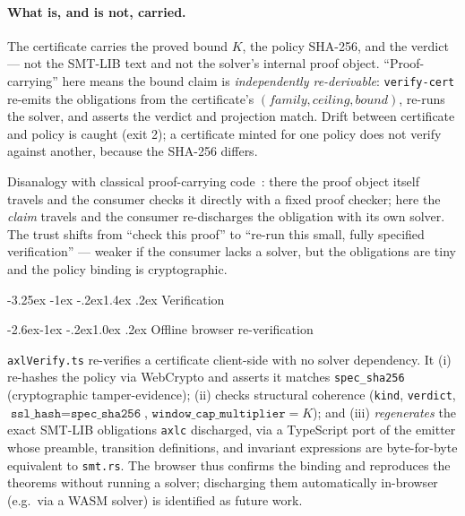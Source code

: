 \documentclass[11pt]{article}
\makeatletter
\renewcommand\section{\@startsection{section}{1}{\z@}%
  {-3.25ex \@plus -1ex \@minus -.2ex}{1.4ex \@plus.2ex}%
  {\normalfont\sffamily\Large\bfseries}}
\renewcommand\subsection{\@startsection{subsection}{2}{\z@}%
  {-2.6ex\@plus -1ex \@minus -.2ex}{1.0ex \@plus .2ex}%
  {\normalfont\sffamily\large\bfseries}}
\theoremstyle{plain}
\theoremstyle{definition}
\theoremstyle{remark}
\makeatother
\begin{document}
\paragraph{What is, and is not, carried.}
The certificate carries the proved bound $K$, the policy SHA-256, and the
verdict --- not the SMT-LIB text and not the solver's internal proof object.
``Proof-carrying'' here means the bound claim is \emph{independently
re-derivable}: \texttt{verify-cert} re-emits the obligations from the
certificate's $(\textit{family},\textit{ceiling},\textit{bound})$, re-runs the
solver, and asserts the verdict and projection match. Drift between
certificate and policy is caught (exit 2); a certificate minted for one policy
does not verify against another, because the SHA-256 differs.

Disanalogy with classical proof-carrying code~\citep{necula1997}: there the
proof object itself travels and the consumer checks it directly with a fixed
proof checker; here the \emph{claim} travels and the consumer re-discharges the
obligation with its own solver. The trust shifts from ``check this proof'' to
``re-run this small, fully specified verification'' --- weaker if the consumer
lacks a solver, but the obligations are tiny and the policy binding is
cryptographic.

\section{Verification}\label{sec:verification}

\subsection{Offline browser re-verification}

\texttt{axlVerify.ts} re-verifies a certificate client-side with no solver
dependency. It (i) re-hashes the policy via WebCrypto and asserts it matches
\texttt{spec\_sha256} (cryptographic tamper-evidence); (ii) checks structural
coherence (\texttt{kind}, \texttt{verdict}, $\texttt{ssl\_hash} =
\texttt{spec\_sha256}$, $\texttt{window\_cap\_multiplier} = K$); and (iii)
\emph{regenerates} the exact SMT-LIB obligations \texttt{axlc} discharged, via
a TypeScript port of the emitter whose preamble, transition definitions, and
invariant expressions are byte-for-byte equivalent to \texttt{smt.rs}. The
browser thus confirms the binding and reproduces the theorems without running a
solver; discharging them automatically in-browser (e.g.\ via a WASM solver) is
identified as future work.
\end{document}
